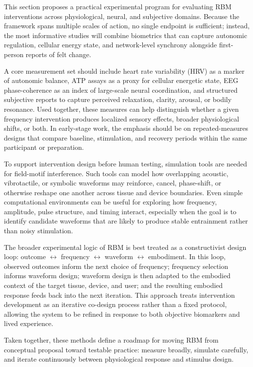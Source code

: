 This section proposes a practical experimental program for evaluating RBM interventions across physiological, neural, and subjective domains. Because the framework spans multiple scales of action, no single endpoint is sufficient; instead, the most informative studies will combine biometrics that can capture autonomic regulation, cellular energy state, and network-level synchrony alongside first-person reports of felt change.

A core measurement set should include heart rate variability (HRV) as a marker of autonomic balance, ATP assays as a proxy for cellular energetic state, EEG phase-coherence as an index of large-scale neural coordination, and structured subjective reports to capture perceived relaxation, clarity, arousal, or bodily resonance. Used together, these measures can help distinguish whether a given frequency intervention produces localized sensory effects, broader physiological shifts, or both. In early-stage work, the emphasis should be on repeated-measures designs that compare baseline, stimulation, and recovery periods within the same participant or preparation.

To support intervention design before human testing, simulation tools are needed for field-motif interference. Such tools can model how overlapping acoustic, vibrotactile, or symbolic waveforms may reinforce, cancel, phase-shift, or otherwise reshape one another across tissue and device boundaries. Even simple computational environments can be useful for exploring how frequency, amplitude, pulse structure, and timing interact, especially when the goal is to identify candidate waveforms that are likely to produce stable entrainment rather than noisy stimulation.

The broader experimental logic of RBM is best treated as a constructivist design loop: outcome $\leftrightarrow$ frequency $\leftrightarrow$ waveform $\leftrightarrow$ embodiment. In this loop, observed outcomes inform the next choice of frequency; frequency selection informs waveform design; waveform design is then adapted to the embodied context of the target tissue, device, and user; and the resulting embodied response feeds back into the next iteration. This approach treats intervention development as an iterative co-design process rather than a fixed protocol, allowing the system to be refined in response to both objective biomarkers and lived experience.

Taken together, these methods define a roadmap for moving RBM from conceptual proposal toward testable practice: measure broadly, simulate carefully, and iterate continuously between physiological response and stimulus design.
